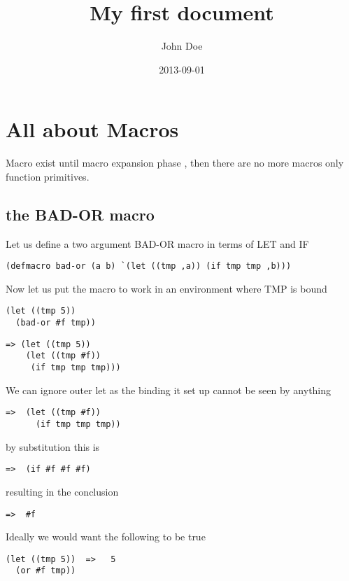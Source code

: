 \documentclass{article}
\title{My first document}
\date{2013-09-01}
\author{John Doe}
\begin{document}
\maketitle
\newpage
{}

\section{All about Macros}

Macro exist until macro expansion phase , then there are no more macros only function primitives.

\subsection{the BAD-OR macro}

Let us define a two argument BAD-OR macro in terms of LET and IF

\begin{verbatim}
(defmacro bad-or (a b) `(let ((tmp ,a)) (if tmp tmp ,b)))
\end{verbatim}

Now let us put the macro to work in an environment where TMP is bound


\begin{verbatim}
(let ((tmp 5)) 
  (bad-or #f tmp))
\end{verbatim}

\begin{verbatim}
=> (let ((tmp 5)) 
    (let ((tmp #f))
     (if tmp tmp tmp)))
\end{verbatim}

We can ignore outer let as the binding it set up cannot be seen by anything

\begin{verbatim}
=>  (let ((tmp #f))
      (if tmp tmp tmp))
\end{verbatim}

by substitution this is 

\begin{verbatim}
=>  (if #f #f #f)
\end{verbatim}

resulting in the conclusion

\begin{verbatim}
=>  #f
\end{verbatim}

Ideally we would want the following to be true

\begin{verbatim}
(let ((tmp 5))  =>   5
  (or #f tmp))
\end{verbatim}
\end{document}
